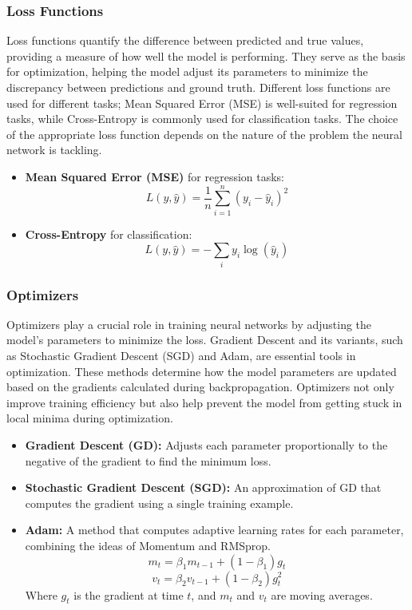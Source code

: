 \subsubsection*{Loss Functions}

Loss functions quantify the difference between predicted and true values, providing a measure of how well the model is performing. They serve as the basis for optimization, helping the model adjust its parameters to minimize the discrepancy between predictions and ground truth. Different loss functions are used for different tasks; Mean Squared Error (MSE) is well-suited for regression tasks, while Cross-Entropy is commonly used for classification tasks. The choice of the appropriate loss function depends on the nature of the problem the neural network is tackling.
\begin{itemize}
    \item \textbf{Mean Squared Error (MSE)} for regression tasks:
    \[ L(y, \hat{y}) = \frac{1}{n} \sum_{i=1}^{n} (y_i - \hat{y}_i)^2 \]

    \item \textbf{Cross-Entropy} for classification:
    \[ L(y, \hat{y}) = -\sum_{i} y_i \log(\hat{y}_i) \]
\end{itemize}


\subsubsection*{Optimizers}

Optimizers play a crucial role in training neural networks by adjusting the model's parameters to minimize the loss. Gradient Descent and its variants, such as Stochastic Gradient Descent (SGD) and Adam, are essential tools in optimization. These methods determine how the model parameters are updated based on the gradients calculated during backpropagation. Optimizers not only improve training efficiency but also help prevent the model from getting stuck in local minima during optimization.
\begin{itemize}
    \item \textbf{Gradient Descent (GD):} Adjusts each parameter proportionally to the negative of the gradient to find the minimum loss.
    
    \item \textbf{Stochastic Gradient Descent (SGD):} An approximation of GD that computes the gradient using a single training example.
    
    \item \textbf{Adam:} A method that computes adaptive learning rates for each parameter, combining the ideas of Momentum and RMSprop.
    \[ m_t = \beta_1 m_{t-1} + (1-\beta_1)g_t \]
    \[ v_t = \beta_2 v_{t-1} + (1-\beta_2)g_t^2 \]
    Where \( g_t \) is the gradient at time \( t \), and \( m_t \) and \( v_t \) are moving averages.
\end{itemize}


